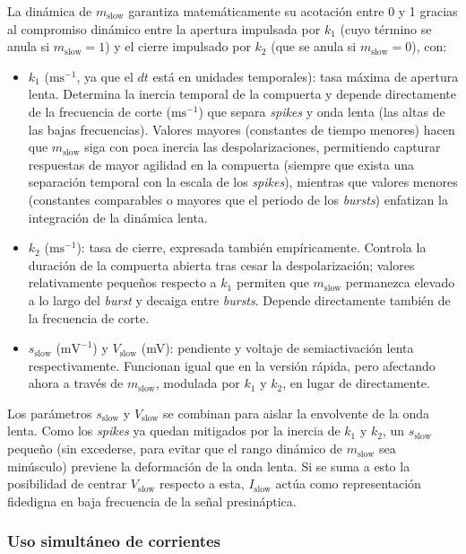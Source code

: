 La dinámica de \(m_{\mathrm{slow}}\) garantiza matemáticamente su acotación entre 0 y 1 gracias al compromiso dinámico entre la apertura impulsada por \(k_1\) (cuyo término se anula si \(m_{\mathrm{slow}} = 1\)) y el cierre impulsado por \(k_2\) (que se anula si \(m_{\mathrm{slow}} = 0\)), con:
\begin{itemize}
    \item \(k_1\) (\(\mathrm{ms}^{-1}\), ya que el \(dt\) está en unidades temporales): tasa máxima de apertura lenta. Determina la inercia temporal de la compuerta y depende directamente de la frecuencia de corte (\(\mathrm{ms}^{-1}\)) que separa \textit{spikes} y onda lenta (las altas de las bajas frecuencias). Valores mayores (constantes de tiempo menores) hacen que \(m_{\mathrm{slow}}\) siga con poca inercia las despolarizaciones, permitiendo capturar respuestas de mayor agilidad en la compuerta (siempre que exista una separación temporal con la escala de los \textit{spikes}), mientras que valores menores (constantes comparables o mayores que el periodo de los \textit{bursts}) enfatizan la integración de la dinámica lenta.
    \item \(k_2\) (\(\mathrm{ms}^{-1}\)): tasa de cierre, expresada también empíricamente. Controla la duración de la compuerta abierta tras cesar la despolarización; valores relativamente pequeños respecto a \(k_1\) permiten que \(m_{\mathrm{slow}}\) permanezca elevado a lo largo del \textit{burst} y decaiga entre \textit{bursts}. Depende directamente también de la frecuencia de corte.
    \item \(s_{\mathrm{slow}}\) (\(\mathrm{mV}^{-1}\)) y \(V_{\mathrm{slow}}\) (mV): pendiente y voltaje de semiactivación lenta respectivamente. Funcionan igual que en la versión rápida, pero afectando ahora a través de \(m_{\mathrm{slow}}\), modulada por \(k_1\) y \(k_2\), en lugar de directamente.
\end{itemize}

Los parámetros \(s_{\mathrm{slow}}\) y \(V_{\mathrm{slow}}\) se combinan para aislar la envolvente de la onda lenta. Como los \textit{spikes} ya quedan mitigados por la inercia de \(k_1\) y \(k_2\), un \(s_{\mathrm{slow}}\) pequeño (sin excederse, para evitar que el rango dinámico de \(m_{\mathrm{slow}}\) sea minúsculo) previene la deformación de la onda lenta. Si se suma a esto la posibilidad de centrar \(V_{\mathrm{slow}}\) respecto a esta, \(I_{\mathrm{slow}}\) actúa como representación fidedigna en baja frecuencia de la señal presináptica.

\subsubsection{Uso simultáneo de corrientes\label{SUBSEC:USO_SIMULTANEO}}

